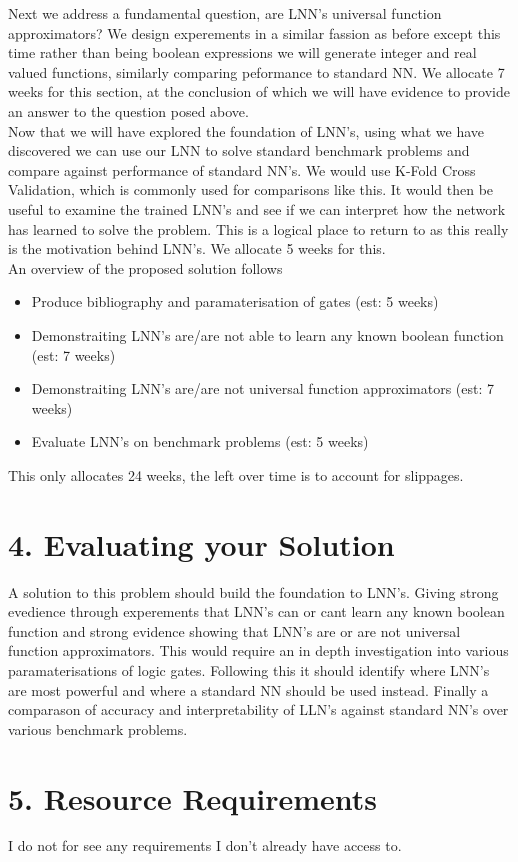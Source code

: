 \begin{appendices}
Next we address a fundamental question, are LNN's universal function approximators? We design experements in a similar fassion as before except this time rather than being boolean expressions we will generate integer and real valued functions, similarly comparing peformance to standard NN. We allocate 7 weeks for this section, at the conclusion of which we will have evidence to provide an answer to the question posed above. \\

Now that we will have explored the foundation of LNN's, using what we have discovered we can use our LNN to solve standard benchmark problems and compare against performance of standard NN's. We would use K-Fold Cross Validation, which is commonly used for comparisons like this. It would then be useful to examine the trained LNN's and see if we can interpret how the network has learned to solve the problem. This is a logical place to return to as this really is the motivation behind LNN's. We allocate 5 weeks for this. \\

An overview of the proposed solution follows
\begin{itemize}
	\item Produce bibliography and paramaterisation of gates (est: 5 weeks)
	\item Demonstraiting LNN's are/are not able to learn any known boolean function (est: 7 weeks)
	\item Demonstraiting LNN's are/are not universal function approximators (est: 7 weeks)
	\item Evaluate LNN's on benchmark problems (est: 5 weeks)
\end{itemize}
This only allocates 24 weeks, the left over time is to account for slippages.


\section*{4. Evaluating your Solution}

A solution to this problem should build the foundation to LNN's. Giving strong evedience through experements that LNN's can or cant learn any known boolean function and strong evidence showing that LNN's are or are not universal function approximators. This would require an in depth investigation into various paramaterisations of logic gates. Following this it should identify where LNN's are most powerful and where a standard NN should be used instead. Finally a comparason of accuracy and interpretability of LLN's against standard NN's over various benchmark problems.

\section*{5. Resource Requirements}

I do not for see any requirements I don't already have access to.
	
\end{appendices}